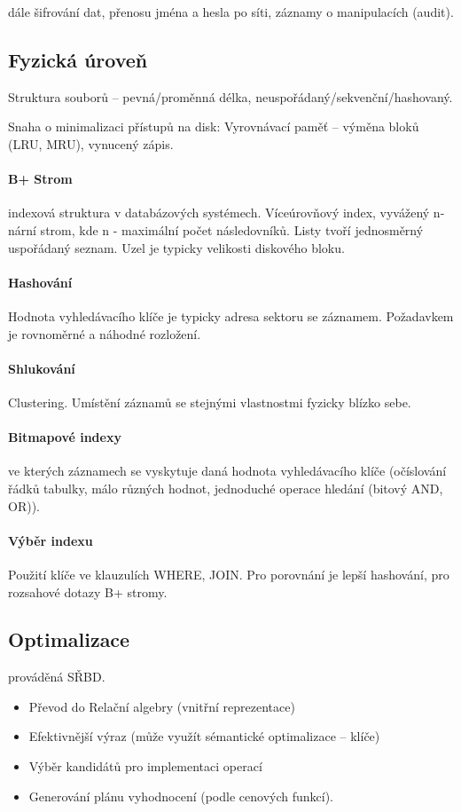 \documentclass[a4paper, 11pt]{report}
\begin{document}
dále šifrování dat, přenosu jména a hesla po síti, záznamy o manipulacích (audit).

\subsection{Fyzická úroveň}

Struktura souborů -- pevná/proměnná délka, neuspořádaný/sekvenční/hashovaný.

Snaha o minimalizaci přístupů na disk: Vyrovnávací paměť -- výměna bloků (LRU, MRU), vynucený zápis.

\paragraph{B+ Strom} indexová struktura v databázových systémech. Víceúrovňový index, vyvážený n-nární strom, kde n - maximální počet následovníků. Listy tvoří jednosměrný uspořádaný seznam. Uzel je typicky velikosti diskového bloku.

\paragraph{Hashování}
Hodnota vyhledávacího klíče je typicky adresa sektoru se záznamem. Požadavkem je rovnoměrné a náhodné rozložení.

\paragraph{Shlukování} Clustering. Umístění záznamů se stejnými vlastnostmi fyzicky blízko sebe. 

\paragraph{Bitmapové indexy} ve kterých záznamech se vyskytuje daná hodnota vyhledávacího klíče (očíslování řádků tabulky, málo různých hodnot, jednoduché operace hledání (bitový AND, OR)).

\paragraph{Výběr indexu}
Použití klíče ve klauzulích WHERE, JOIN. Pro porovnání je lepší hashování, pro rozsahové dotazy B+ stromy.

\subsection{Optimalizace}
prováděná SŘBD.
\begin{itemize}
	\item Převod do Relační algebry (vnitřní reprezentace)
	\item Efektivnější výraz (může využít sémantické optimalizace -- klíče)
	\item Výběr kandidátů pro implementaci operací
	\item Generování plánu vyhodnocení (podle cenových funkcí).
\end{itemize}
\end{document}
